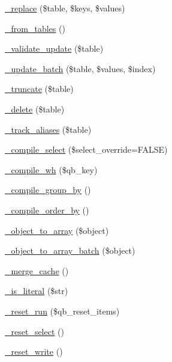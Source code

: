 \begin{DoxyCompactItemize}
\item 
\mbox{\hyperlink{class_c_i___d_b__query__builder_a985d47deea7ebc5ec34b41b71736cbb2}{\+\_\+replace}} (\$table, \$keys, \$values)
\item 
\mbox{\hyperlink{class_c_i___d_b__query__builder_a87012ec307f0f3b7eb1b4bba68a20dd2}{\+\_\+from\+\_\+tables}} ()
\item 
\mbox{\hyperlink{class_c_i___d_b__query__builder_a25f878a242d0b34bd1ed1b83431714af}{\+\_\+validate\+\_\+update}} (\$table)
\item 
\mbox{\hyperlink{class_c_i___d_b__query__builder_a861b73c482de70dbd12d0b6fe11a5d4c}{\+\_\+update\+\_\+batch}} (\$table, \$values, \$index)
\item 
\mbox{\hyperlink{class_c_i___d_b__query__builder_a057560cdbf8c8e85ca668d81a2e8c81c}{\+\_\+truncate}} (\$table)
\item 
\mbox{\hyperlink{class_c_i___d_b__query__builder_afe8fd9a27e61e862c20116d365035b8c}{\+\_\+delete}} (\$table)
\item 
\mbox{\hyperlink{class_c_i___d_b__query__builder_a12ff3d6972410ec9b170882f559e6fe9}{\+\_\+track\+\_\+aliases}} (\$table)
\item 
\mbox{\hyperlink{class_c_i___d_b__query__builder_a006319db39d1e7547e5a90a2e67ac9f0}{\+\_\+compile\+\_\+select}} (\$select\+\_\+override=F\+A\+L\+SE)
\item 
\mbox{\hyperlink{class_c_i___d_b__query__builder_a743ba2834429e8f7638562c0a590fc80}{\+\_\+compile\+\_\+wh}} (\$qb\+\_\+key)
\item 
\mbox{\hyperlink{class_c_i___d_b__query__builder_ae5bab30c9e567c01524e66ec3b20360c}{\+\_\+compile\+\_\+group\+\_\+by}} ()
\item 
\mbox{\hyperlink{class_c_i___d_b__query__builder_a93497f72c441881a767099ef74f2a2bf}{\+\_\+compile\+\_\+order\+\_\+by}} ()
\item 
\mbox{\hyperlink{class_c_i___d_b__query__builder_af9ea4bd5669fa28727e491dc722fba63}{\+\_\+object\+\_\+to\+\_\+array}} (\$object)
\item 
\mbox{\hyperlink{class_c_i___d_b__query__builder_aaf29364a6055eec0b3c0486e1de63d2e}{\+\_\+object\+\_\+to\+\_\+array\+\_\+batch}} (\$object)
\item 
\mbox{\hyperlink{class_c_i___d_b__query__builder_aa43427c509a9babad4100e40b312f087}{\+\_\+merge\+\_\+cache}} ()
\item 
\mbox{\hyperlink{class_c_i___d_b__query__builder_a8a7a314f029ded37259e424949cf60c6}{\+\_\+is\+\_\+literal}} (\$str)
\item 
\mbox{\hyperlink{class_c_i___d_b__query__builder_a72194f4a9eada89d106e9f0232111b0b}{\+\_\+reset\+\_\+run}} (\$qb\+\_\+reset\+\_\+items)
\item 
\mbox{\hyperlink{class_c_i___d_b__query__builder_af2eefd36a0aa741e8ff0b0ce150a1652}{\+\_\+reset\+\_\+select}} ()
\item 
\mbox{\hyperlink{class_c_i___d_b__query__builder_ae603144f9a3c6733964bb48bff3d7619}{\+\_\+reset\+\_\+write}} ()
\end{DoxyCompactItemize}
